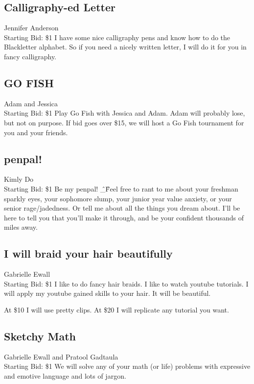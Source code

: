 \documentclass[11pt]{article}
\begin{document}
\subsection{Calligraphy-ed Letter}
Jennifer Anderson
\\
Starting Bid: \$1
\newline
I have some nice calligraphy pens and know how to do the Blackletter alphabet. So if you need a nicely written letter, I will do it for you in fancy calligraphy.
\subsection{GO FISH}
Adam and Jessica
\\
Starting Bid: \$1
\newline
Play Go Fish with Jessica and Adam. Adam will probably lose, but not on purpose. 
If bid goes over \$15, we will host a Go Fish tournament for you and your friends.
\subsection{penpal!}
Kimly Do
\\
Starting Bid: \$1
\newline
Be my penpal! \^\_\^ Feel free to rant to me about your freshman sparkly eyes, your sophomore slump, your junior year value anxiety, or your senior rage/jadedness. Or tell me about all the things you dream about. I'll be here to tell you that you'll make it through, and be your confident thousands of miles away.
\subsection{I will braid your hair beautifully}
Gabrielle Ewall
\\
Starting Bid: \$1
\newline
I like to do fancy hair braids.  I like to watch youtube tutorials.  I will apply my youtube gained skills to your hair.  It will be beautiful.

At \$10 I will use pretty clips. 
At \$20 I will replicate any tutorial you want.
\subsection{Sketchy Math}
Gabrielle Ewall and Pratool Gadtaula
\\
Starting Bid: \$1
\newline
We will solve any of your math (or life) problems with expressive and emotive language and lots of jargon.
\end{document}
